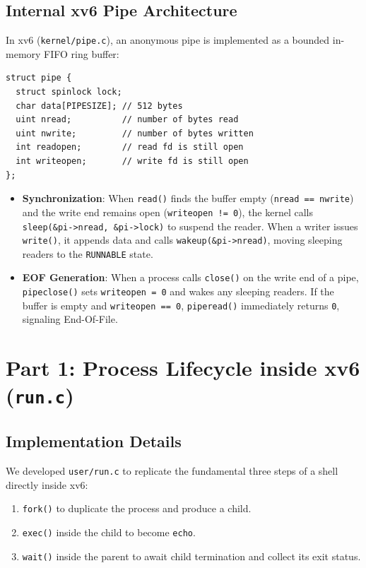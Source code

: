 \documentclass[12pt,a4paper]{article}
\begin{document}
\subsection{Internal xv6 Pipe Architecture}
In xv6 (\texttt{kernel/pipe.c}), an anonymous pipe is implemented as a bounded in-memory FIFO ring buffer:
\begin{lstlisting}[style=cstyle]
struct pipe {
  struct spinlock lock;
  char data[PIPESIZE]; // 512 bytes
  uint nread;          // number of bytes read
  uint nwrite;         // number of bytes written
  int readopen;        // read fd is still open
  int writeopen;       // write fd is still open
};
\end{lstlisting}

\begin{itemize}
    \item \textbf{Synchronization}: When \texttt{read()} finds the buffer empty (\texttt{nread == nwrite}) and the write end remains open (\texttt{writeopen != 0}), the kernel calls \texttt{sleep(\&pi->nread, \&pi->lock)} to suspend the reader. When a writer issues \texttt{write()}, it appends data and calls \texttt{wakeup(\&pi->nread)}, moving sleeping readers to the \texttt{RUNNABLE} state.
    \item \textbf{EOF Generation}: When a process calls \texttt{close()} on the write end of a pipe, \texttt{pipeclose()} sets \texttt{writeopen = 0} and wakes any sleeping readers. If the buffer is empty and \texttt{writeopen == 0}, \texttt{piperead()} immediately returns \texttt{0}, signaling End-Of-File.
\end{itemize}

\newpage

\section{Part 1: Process Lifecycle inside xv6 (\texttt{run.c})}

\subsection{Implementation Details}
We developed \texttt{user/run.c} to replicate the fundamental three steps of a shell directly inside xv6:
\begin{enumerate}
    \item \texttt{fork()} to duplicate the process and produce a child.
    \item \texttt{exec()} inside the child to become \texttt{echo}.
    \item \texttt{wait()} inside the parent to await child termination and collect its exit status.
\end{enumerate}
\end{document}
